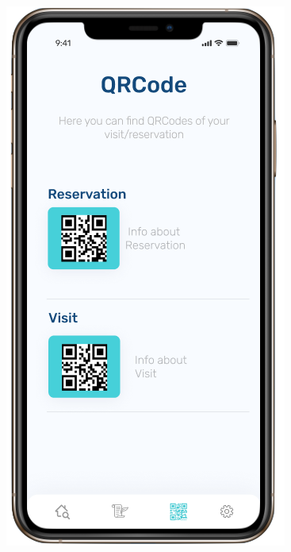 \begin{figure}[H]
\begin{center}
{           \includegraphics[scale=0.35]{images/mockup/qr4.png}
        }\\ %
\end{center}
\end{figure}
